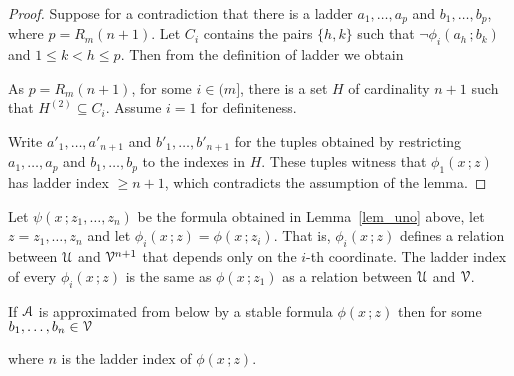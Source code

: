 \documentclass[scombinatorics.tex]{subfiles}
\begin{document}
\begin{proof} 
  Suppose for a contradiction that there is a ladder $a_1,\dots,a_p$ and $b_1,\dots,b_p$, where $p=R_m(n+1)$.
  Let $C_i$ contains the pairs $\{h,k\}$ such that $\neg\phi_i(a_h\,;b_k)$ and $1\le k<h\le p$.
  Then from the definition of ladder we obtain 
  
  \ceq{\hfill\bigcup_{i=1}^mC_i}{=}{\binom{(n]}{2}}
  
  As $p=R_m(n+1)$, for some $i\in(m]$, there is a set $H$ of cardinality $n+1$ such that $H^{(2)}\subseteq C_i$.
  Assume $i{=}1$ for definiteness.

  Write $a'_1,\dots,a'_{n+1}$ and $b'_1,\dots,b'_{n+1}$ for the tuples obtained by restricting $a_1,\dots,a_p$ and $b_1,\dots,b_p$ to the indexes in $H$.
  These tuples witness that $\phi_1(x\,;z)$ has ladder index $\ge n+1$, which contradicts the assumption of the lemma.
\end{proof}

Let $\psi(x\,;z_1,\dots,z_n)$ be the formula obtained in Lemma~\ref{lem_uno} above, let $z=z_1,\dots,z_n$ and let $\phi_i(x\,;z)=\phi(x\,;z_i)$.
That is, $\phi_i(x\,;z)$ defines a relation between $\EuScript U$ and $\EuScript V^{n+1}$ that depends only on the $i$-th coordinate.
The ladder index of every $\phi_i(x\,;z)$ is the same as $\phi(x\,;z_1)$ as a relation between $\EuScript U$ and $\EuScript V$.


\begin{lemma}
  If $\EuScript A$ is approximated from below by a stable formula $\phi(x\,;z)$ then for some $b_1,\dots,b_n\in\EuScript V$ 
  \\[-1ex]
  
  where $n$ is the ladder index of $\phi(x\,;z)$.
\end{lemma}
  
\end{document}
